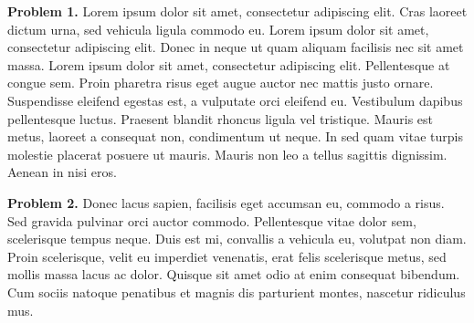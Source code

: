\documentclass[12pt]{article}
\begin{document}
{\bfseries Problem 1.}
Lorem ipsum dolor sit amet, consectetur adipiscing elit. Cras laoreet 
dictum urna, sed vehicula ligula commodo eu. Lorem ipsum dolor sit 
amet, consectetur adipiscing elit. Donec in neque ut quam aliquam 
facilisis nec sit amet massa. Lorem ipsum dolor sit amet, consectetur 
adipiscing elit. Pellentesque at congue sem. Proin pharetra risus 
eget augue auctor nec mattis justo ornare. Suspendisse eleifend 
egestas est, a vulputate orci eleifend eu. Vestibulum dapibus 
pellentesque luctus. Praesent blandit rhoncus ligula vel tristique. 
Mauris est metus, laoreet a consequat non, condimentum ut neque. In 
sed quam vitae turpis molestie placerat posuere ut mauris. Mauris non leo a
tellus sagittis dignissim. Aenean in nisi eros.

{\bfseries Problem 2.}
Donec lacus sapien, facilisis eget accumsan eu, commodo a risus. Sed
gravida pulvinar orci auctor commodo. Pellentesque vitae dolor sem,
scelerisque tempus neque. Duis est mi, convallis a vehicula eu, volutpat
non diam. Proin scelerisque, velit eu imperdiet venenatis, erat felis
scelerisque metus, sed mollis massa lacus ac dolor. Quisque sit amet odio
at enim consequat bibendum. Cum sociis natoque penatibus et magnis dis
parturient montes, nascetur ridiculus mus.
\end{document}
